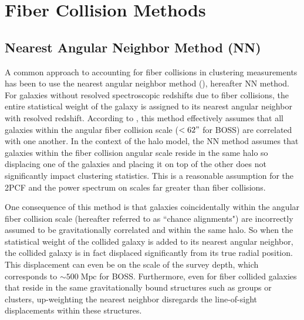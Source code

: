\section{Fiber Collision Methods} \label{sec:fc_corr}
\subsection{Nearest Angular Neighbor Method (NN)} \label{sec:fc_pk}
A common approach to accounting for fiber collisions in clustering measurements has been 
to use the nearest angular neighbor method (\citealt{Zehavi:2002aa, Zehavi:2005aa, 
Berlind:2006aa, Zehavi:2011aa, Anderson:2012aa}),
hereafter NN method. For galaxies without resolved spectroscopic redshifts due to fiber 
collisions, the entire statistical weight of the galaxy is assigned to its nearest angular 
neighbor with resolved redshift. 
According to \cite{Zehavi:2002aa}, this method 
effectively assumes that all galaxies within the angular fiber collision scale ($< 62"$ for BOSS) are correlated with one another. 
In the context of the halo model, the NN method assumes that 
galaxies within the fiber collision angular scale reside in the same halo 
so displacing one of the galaxies and placing it on top of the other does 
not significantly impact clustering statistics. %
This is a reasonable assumption  
for the 2PCF and the power spectrum on scales far greater than fiber collisions.  

One consequence of this method is that galaxies coincidentally within the angular 
fiber collision scale (hereafter referred to as ``chance 
alignments") are incorrectly assumed to be gravitationally correlated and 
within the same halo. So when the statistical weight of the collided galaxy
is added to its nearest angular neighbor, the collided galaxy is in fact 
displaced significantly from its true radial position. This displacement can even 
be on the scale of the survey depth, which corresponds to $\sim500\;\mathrm{Mpc}$
for BOSS. Furthermore, even for fiber collided galaxies that reside in the 
same gravitationally bound structures such as groups or clusters, up-weighting 
the nearest neighbor disregards the line-of-sight displacements within these 
structures. 

